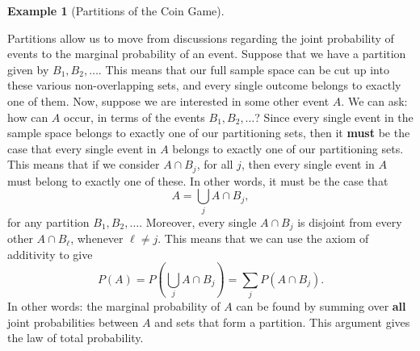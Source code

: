 \documentclass[
  letterpaper,
  DIV=11,
  numbers=noendperiod]{scrreprt}
\theoremstyle{definition}
\theoremstyle{definition}
\theoremstyle{definition}
\newtheorem{example}{Example}[chapter]
\theoremstyle{remark}
\begin{document}
\begin{example}[Partitions of the Coin
Game]
\begin{tcolorbox}[enhanced jigsaw, colback=white, breakable, rightrule=.15mm, leftrule=.75mm, toprule=.15mm, left=2mm, arc=.35mm, opacityback=0, bottomrule=.15mm]
\end{tcolorbox}

\end{example}

Partitions allow us to move from discussions regarding the joint
probability of events to the marginal probability of an event. Suppose
that we have a partition given by \(B_1, B_2, \dots\). This means that
our full sample space can be cut up into these various non-overlapping
sets, and every single outcome belongs to exactly one of them. Now,
suppose we are interested in some other event \(A\). We can ask: how can
\(A\) occur, in terms of the events \(B_1, B_2, \dots\)? Since every
single event in the sample space belongs to exactly one of our
partitioning sets, then it \textbf{must} be the case that every single
event in \(A\) belongs to exactly one of our partitioning sets. This
means that if we consider \(A\cap B_j\), for all \(j\), then every
single event in \(A\) must belong to exactly one of these. In other
words, it must be the case that \[A = \bigcup_{j} A\cap B_j,\] for any
partition \(B_1, B_2,\dots\). Moreover, every single \(A\cap B_j\) is
disjoint from every other \(A \cap B_\ell\), whenever \(\ell \neq j\).
This means that we can use the axiom of additivity to give
\[P(A) = P\left(\bigcup_{j} A\cap B_j\right) = \sum_{j} P(A \cap B_j).\]
In other words: the marginal probability of \(A\) can be found by
summing over \textbf{all} joint probabilities between \(A\) and sets
that form a partition. This argument gives the law of total probability.
\end{document}
